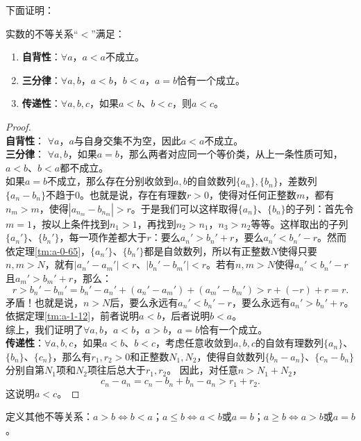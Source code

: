 \documentclass[12pt,UTF8,fontset=none]{ctexbook}
\begin{document}
\begin{appendix}
下面证明：
\begin{tm}\label{tm:a-1-15}
    实数的不等关系“$<$”满足：
    \begin{enumerate}
        \item \textbf{自背性}：$\forall a$，$a < a$不成立。
        \item \textbf{三分律}：$\forall a, b$，$a < b$，$b < a$，$a = b$恰有一个成立。
        \item \textbf{传递性}：$\forall a, b, c$，如果$a < b$、$b < c$，则$a < c$。
    \end{enumerate}
\end{tm}
\begin{proof}
    \mbox{} \\
    \textbf{自背性}： $\forall a$，$a$与自身交集不为空，因此$a<a$不成立。\\
    \textbf{三分律}： $\forall a, b$，如果$a = b$，那么两者对应同一个等价类，从上一条性质可知，$a<b$、$b<a$都不成立。\\
    如果$a = b$不成立，那么存在分别收敛到$a,b$的自敛数列$\{a_n\}, \{b_n\}$，差数列$\{a_n - b_n\}$不趋于$0$。也就是说，存在有理数$r>0$，使得对任何正整数$m$，都有$n_m>m$，使得$|a_{n_m} - b_{n_m}| > r$。于是我们可以这样取得$\{a_n\}$、$\{b_n\}$的子列：首先令$m=1$，按以上条件找到$n_1>1$，再找到$n_2>n_1$，$n_3>n_2$等等。这样取出的子列$\{a_n'\}$、$\{b_n'\}$，每一项作差都大于$r$：要么$a_{n}' > b_{n}' + r$，要么$a_{n}' < b_{n}' - r$。然而依定理\ref{tm:a-0-65}，$\{a_n'\}$、$\{b_n'\}$都是自敛数列，所以有正整数$N$使得只要$n,m>N$，就有$|a_n' - a_m'| < r$、$|b_n' - b_m'| < r$。若有$n,m>N$使得$a_{n}' < b_{n}' - r$且$a_{m}' > b_{m}' + r$，那么：
    $$ r > b_{n}' - b_m' = b_{n}' - a_{n}' + (a_{n}' - a_m') + (a_m' - b_m') > r + (-r) + r = r.$$
    矛盾！也就是说，$n>N$后，要么永远有$a_{n}' < b_{n}' - r$，要么永远有$a_{n}' > b_{n}' + r$。依据定理\ref{tm:a-1-12}，前者说明$a<b$，后者说明$b<a$。\\
    综上，我们证明了$\forall a, b$，$a < b$，$a > b$，$a = b$恰有一个成立。\\
    \textbf{传递性}：$\forall a, b, c$，如果$a < b$、$b < c$，考虑任意收敛到$a,b,c$的自敛有理数列$\{a_n\}$、$\{b_n\}$、$\{c_n\}$，那么有$r_1, r_2>0$和正整数$N_1, N_2$，使得自敛数列$\{b_n - a_n\}$、$\{c_n - b_n\}$分别自第$N_1$项和$N_2$项往后总大于$r_1, r_2$。
    因此，对任意$n>N_1 + N_2$，
    $$ c_n - a_n = c_n - b_n + b_n - a_n > r_1 + r_2.$$
    这说明$a<c$。
\end{proof}

定义其他不等关系：$a>b \Leftrightarrow b<a$；$a\leqslant b \Leftrightarrow a < b$或$a = b$；$a\geqslant b \Leftrightarrow a > b$或$a = b$。


\end{appendix}
\end{document}
